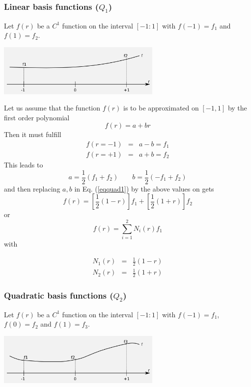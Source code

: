 
\subsubsection{Linear basis functions ($Q_1$)}

Let $f(r)$ be a $C^1$ function on the interval $[-1:1]$ with $f(-1)=f_1$  and $f(1)=f_2$.
\begin{center}
\includegraphics[width=8cm]{images/linshapefct.png}
\end{center}
Let us assume that the function $f(r)$ is to be approximated on $[-1,1]$ by the first order polynomial 
\begin{equation}
f(r)=a+br \label{eqquad1}
\end{equation}
Then it must fulfill
\begin{eqnarray}
f(r=-1)&=&a-b =f_1 \nonumber\\
f(r=+1)&=&a+b =f_2 \nonumber
\end{eqnarray}
This leads to  
\[
a=\frac{1}{2}(f_1+f_2)  
\quad\quad
b=\frac{1}{2}(-f_1+f_2)  
\]
and then replacing $a,b$ in Eq. (\ref{eqquad1}) by the above values on gets
\[
f(r) = \left[  \frac{1}{2}(1-r)\right] f_1 + \left[ \frac{1}{2}(1+r) \right] f_2
\]
or
\[
f(r)=\sum_{i=1}^2 N_i(r) f_1
\]
with
\begin{mdframed}[backgroundcolor=blue!5]
\begin{eqnarray}
N_1(r) &=& \frac{1}{2} (1-r) \nonumber\\
N_2(r) &=& \frac{1}{2} (1+r)
\end{eqnarray}
\end{mdframed}

\subsubsection{Quadratic basis functions ($Q_2$)}

Let $f(r)$ be a $C^1$ function on the interval $[-1:1]$ with $f(-1)=f_1$, $f(0)=f_2$ and $f(1)=f_3$.
\begin{center}
\includegraphics[width=8cm]{images/quadshapefct.png}
\end{center}

